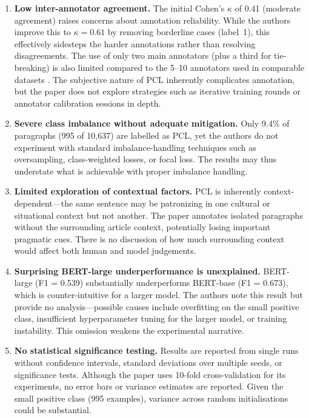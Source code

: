 \documentclass[11pt,a4paper]{article}
\begin{document}
\begin{enumerate}[leftmargin=*]
    \item \textbf{Low inter-annotator agreement.}
    The initial Cohen's $\kappa$ of 0.41 (moderate agreement) raises
    concerns about annotation reliability. While the authors improve this
    to $\kappa = 0.61$ by removing borderline cases (label~1), this
    effectively sidesteps the harder annotations rather than resolving
    disagreements. The use of only two main annotators (plus a third for
    tie-breaking) is also limited compared to the 5--10 annotators used
    in comparable datasets \citep{zampieri2019predicting}. The subjective
    nature of PCL inherently complicates annotation, but the paper does
    not explore strategies such as iterative training rounds or annotator
    calibration sessions in depth.

    \item \textbf{Severe class imbalance without adequate mitigation.}
    Only 9.4\% of paragraphs (995 of 10,637) are labelled as PCL, yet
    the authors do not experiment with standard imbalance-handling
    techniques such as oversampling, class-weighted losses, or focal
    loss. The results may thus understate what is achievable with
    proper imbalance handling.

    \item \textbf{Limited exploration of contextual factors.}
    PCL is inherently context-dependent---the same sentence may be
    patronizing in one cultural or situational context but not another.
    The paper annotates isolated paragraphs without the surrounding
    article context, potentially losing important pragmatic cues. There
    is no discussion of how much surrounding context would affect both
    human and model judgements.

    \item \textbf{Surprising BERT-large underperformance is unexplained.}
    BERT-large (F1 = 0.539) substantially underperforms BERT-base
    (F1 = 0.673), which is counter-intuitive for a larger model. The
    authors note this result but provide no analysis---possible causes
    include overfitting on the small positive class, insufficient
    hyperparameter tuning for the larger model, or training instability.
    This omission weakens the experimental narrative.

    \item \textbf{No statistical significance testing.}
    Results are reported from single runs without confidence intervals,
    standard deviations over multiple seeds, or significance tests.
    Although the paper uses 10-fold cross-validation for its experiments,
    no error bars or variance estimates are reported. Given the small
    positive class (995 examples), variance across random initialisations
    could be substantial.
\end{enumerate}
\end{document}
